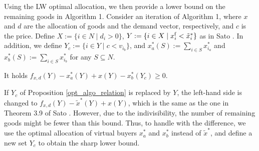 \documentclass[letterpaper,11pt]{article}
\begin{document}
	Using the LW optimal allocation, we then provide a lower bound 
	on the remaining goods in Algorithm 1.
	Consider an iteration of Algorithm 1, where $x$ and $d$ are the allocation 
	of goods and the demand vector, respectively, and $c$ is the price.
	Define $X:=\{i\in N\mid d_i>0\}$, $Y:=\{i\in X\mid x^{\rm f}_i< \tilde{x}^*_i\}$ as in Sato \cite{S2023}.
	In addition, we define $Y_c:=\{i\in Y\mid c< v_{i_{b}} \}$, and 
	$x^*_a(S):= \sum_{i\in S} x^*_{i_a}$ and $x^*_b(S) := \sum_{i\in S} x^*_{i_b}$ for any $S\subseteq N$.
	
	\begin{proposition}
	\label{opt_algo_relation}
	It holds $f_{x,d}(Y)-x_a^*(Y)+x(Y)-x_b^*(Y_c)\geq 0$.
	\end{proposition}
	
	If $Y_c$ of Proposition \ref{opt_algo_relation} is replaced by $Y$,
	the left-hand side is changed to $f_{x,d}(Y)-\tilde{x}^*(Y)+x(Y)$, 
	which is the same as the one in Theorem 3.9 of Sato \cite{S2023}. 
	However, due to the indivisibility, the number of remaining goods might be fewer than this bound. 
	Thus, to handle with the difference, 
	we use the optimal allocation of virtual buyers $x^*_a$ and $x^*_b$ instead of $\tilde{x}^*$, 
	and define a new set $Y_c$ to obtain the sharp lower bound. 
	
\end{document}
